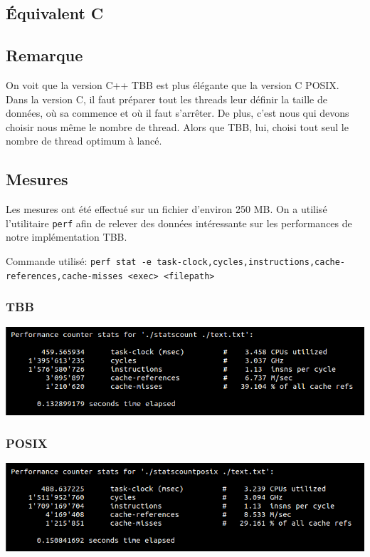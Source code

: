 \documentclass[10pt,a4paper]{article}
\begin{document}
\newpage

\subsection{Équivalent C}



\subsection{Remarque}
On voit que la version C++ TBB est plus élégante que la version C POSIX. Dans la version C, il faut préparer tout les threads leur définir la taille de données, où sa commence et où il faut s'arrêter. De plus, c'est nous qui devons choisir nous même le nombre de thread. Alors que TBB, lui, choisi tout seul le nombre de thread optimum à lancé.

\subsection{Mesures}
Les mesures ont été effectué sur un fichier d'environ 250 MB. On a utilisé l'utilitaire \texttt{perf} afin de relever des données intéressante sur les performances de notre implémentation TBB.

Commande utilisé: \texttt{perf stat -e task-clock,cycles,instructions,cache-references,cache-misses <exec> <filepath> }

\subsubsection{TBB}
\includegraphics[scale=0.5]{images/perf_tbb}


\subsubsection{POSIX}
\includegraphics[scale=0.5]{images/perf_posix}
\newpage
\end{document}
